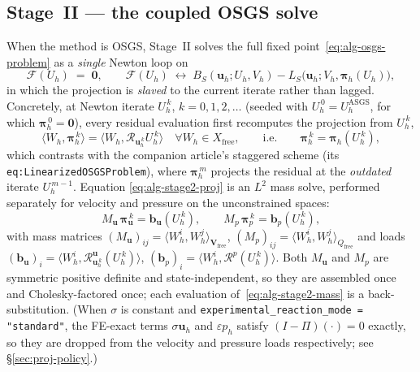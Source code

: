 \documentclass{article}
\newcommand{\code}[1]{\texttt{\small #1}}
\begin{document}
\subsection{Stage~II --- the coupled OSGS solve}
\label{sec:alg-stage2}

When the method is OSGS, Stage~II solves the full fixed
point~\eqref{eq:alg-osgs-problem} as a \emph{single} Newton loop on
\begin{equation}
    \label{eq:alg-stage2-F}
    \mathcal{F}(U_h) \;=\; \boldsymbol{0},
    \qquad
    \mathcal{F}(U_h)
        \;\longleftrightarrow\;
        B_S(\boldsymbol{u}_h; U_h, V_h)
        - L_S\bigl(\boldsymbol{u}_h; V_h, \boldsymbol{\pi}_h(U_h)\bigr),
\end{equation}
in which the projection is \emph{slaved} to the current iterate rather
than lagged. Concretely, at Newton iterate $U_h^{\,k}$, $k = 0,1,2,\dots$
(seeded with $U_h^{\,0} = U_h^{\mathrm{ASGS}}$, for which
$\boldsymbol{\pi}_h^{\,0} = \boldsymbol{0}$), every residual evaluation
first recomputes the projection from $U_h^{\,k}$,
\begin{equation}
    \label{eq:alg-stage2-proj}
    \langle W_h, \boldsymbol{\pi}_h^{\,k}\rangle
        = \langle W_h, \mathcal{R}_{\boldsymbol{u}_h^{\,k}} U_h^{\,k}\rangle
        \quad \forall W_h \in X_{\mathrm{free}},
    \qquad\text{i.e.}\qquad
    \boldsymbol{\pi}_h^{\,k} = \boldsymbol{\pi}_h(U_h^{\,k}),
\end{equation}
which contrasts with the companion article's staggered scheme
(its \code{eq:LinearizedOSGSProblem}), where $\boldsymbol{\pi}_h^{\,m}$ projects
the residual at the \emph{outdated} iterate $U_h^{\,m-1}$. Equation
\eqref{eq:alg-stage2-proj} is an $L^2$ mass solve, performed separately for
velocity and pressure on the unconstrained spaces:
\begin{equation}
    \label{eq:alg-stage2-mass}
    M_{\boldsymbol{u}}\,\boldsymbol{\pi}_{\boldsymbol{u}}^{\,k}
        = \boldsymbol{b}_{\boldsymbol{u}}(U_h^{\,k}),
    \qquad
    M_{p}\,\boldsymbol{\pi}_{p}^{\,k}
        = \boldsymbol{b}_{p}(U_h^{\,k}),
\end{equation}
with mass matrices $(M_{\boldsymbol{u}})_{ij} = \langle W_h^i, W_h^j\rangle_{\boldsymbol{V}_{\mathrm{free}}}$,
$(M_p)_{ij} = \langle W_h^i, W_h^j\rangle_{Q_{\mathrm{free}}}$ and loads
$(\boldsymbol{b}_{\boldsymbol{u}})_i = \langle W_h^i, \mathcal{R}^{\boldsymbol{u}}_{\boldsymbol{u}_h^{\,k}}(U_h^{\,k})\rangle$,
$(\boldsymbol{b}_{p})_i = \langle W_h^i, \mathcal{R}^{p}(U_h^{\,k})\rangle$.
Both $M_{\boldsymbol{u}}$ and $M_p$ are symmetric positive definite and
state-independent, so they are assembled once and Cholesky-factored once;
each evaluation of~\eqref{eq:alg-stage2-mass} is a back-substitution. (When
$\sigma$ is constant and \code{experimental\_reaction\_mode = "standard"},
the FE-exact terms $\sigma\boldsymbol{u}_h$ and $\varepsilon p_h$ satisfy
$(I-\Pi)(\cdot) = 0$ exactly, so they are dropped from the velocity and
pressure loads respectively; see §\ref{sec:proj-policy}.)
\end{document}
